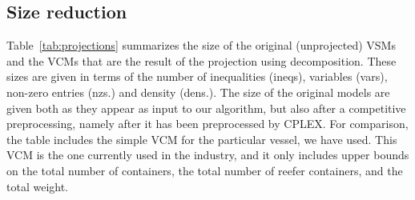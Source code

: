 \subsection{Size reduction}
Table~\ref{tab:projections} summarizes the size of the original (unprojected) VSMs and the VCMs that are the result of the projection using decomposition. These sizes are given in terms of the number of inequalities (ineqs), variables (vars), non-zero entries (nzs.) and density (dens.). The size of the original models are given both as they appear as input to our algorithm, but also after a {competitive} preprocessing, namely after it has been preprocessed by CPLEX. For comparison, the table includes the simple VCM for the particular vessel, we have used. This VCM is the one currently used in the industry, and it only includes upper bounds on the total number of containers, the total number of reefer containers, and the total weight.  


